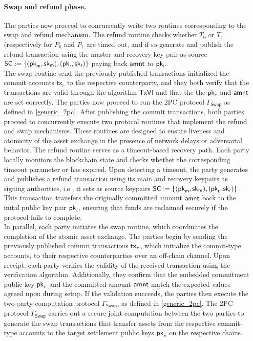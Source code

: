 \paragraph*{Swap and  refund phase.}
The parties now proceed to concurrently write two routines corresponding to the swap and refund mechanism. The refund routine checks whether $T_0$ or $T_1$ (respectively for $P_0$ and $P_1$ are timed out, and if so generate and publish the refund transaction using the master and recovery key pair as source $\mathsf{SC} := \{ (\mathsf{pk}_{\mathsf{m}}, \mathsf{sk}_{\mathsf{m}}), (\mathsf{pk}_{\mathsf{r}}, \mathsf{sk}_{\mathsf{r}}) \}$ paying back $\mathsf{amnt}$ to $\mathsf{pk}_{\mathsf{i}}$. \\
The swap routine send the previously published transactions initialized the commit accounts $\mathsf{tx}_r$ to the respective counterparty, and they both verify that the transactions are valid through the algorithm $\mathsf{TxVf}$ and that the the $\mathsf{pk}_{\mathsf{c}}$ and $\mathsf{amnt}$ are set correctly. The parties now proceed to run the 2PC protocol $\Gamma_\mathsf{Swap}$ as defined in \cref{generic_2pc}. 
After publishing the commit transactions, both parties proceed to concurrently execute two protocol routines that implement the refund and swap mechanisms. These routines are designed to ensure liveness and atomicity of the asset exchange in the presence of network delays or adversarial behavior.
The refund routine serves as a timeout-based recovery path. Each party locally monitors the blockchain state and checks whether the corresponding timeout parameter  or  has expired. Upon detecting a timeout, the party generates and publishes a refund transaction using its main and recovery keypairs as signing authorities, i.e., it sets as source keypairs $\mathsf{SC} := \{ (\mathsf{pk}_{\mathsf{m}}, \mathsf{sk}_{\mathsf{m}}), (\mathsf{pk}_{\mathsf{r}}, \mathsf{sk}_{\mathsf{r}}) \}$. This transaction transfers the originally committed amount $\mathsf{amnt}$ back to the inital public key pair $\mathsf{pk}_i$, ensuring that funds are reclaimed securely if the protocol fails to complete. \\
In parallel, each party initiates the swap routine, which coordinates the completion of the atomic asset exchange. The parties begin by sending the previously published commit transactions $\mathsf{tx}_r$, which initialize the commit-type accounts, to their respective counterparties over an off-chain channel. Upon receipt, each party verifies the validity of the received transaction using the verification algorithm. Additionally, they confirm that the embedded commitment public key $\mathsf{pk}_{\mathsf{c}}$ and the committed amount $\mathsf{amnt}$ match the expected values agreed upon during setup. If the validation succeeds, the parties then execute the two-party computation protocol $\Gamma_{\mathsf{Swap}}$, as defined in \cref{generic_2pc}. The 2PC protocol $\Gamma_{\mathsf{Swap}}$ carries out a secure joint computation between the two parties to generate the swap transactions that transfer assets from the respective commit-type accounts to the target settlement public keys $\mathsf{pk}_s$ on the respective chains.
